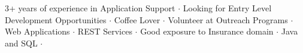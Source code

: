 

\begin{cvparagraph}
3+ years of experience in Application Support ${\cdotp}$ Looking for Entry Level Development Opportunities ${\cdotp}$ Coffee Lover ${\cdotp}$ Volunteer at Outreach Programs ${\cdotp}$ Web Applications ${\cdotp}$ REST Services ${\cdotp}$ Good exposure to Insurance domain ${\cdotp}$ Java and SQL ${\cdotp}$
\end{cvparagraph}
